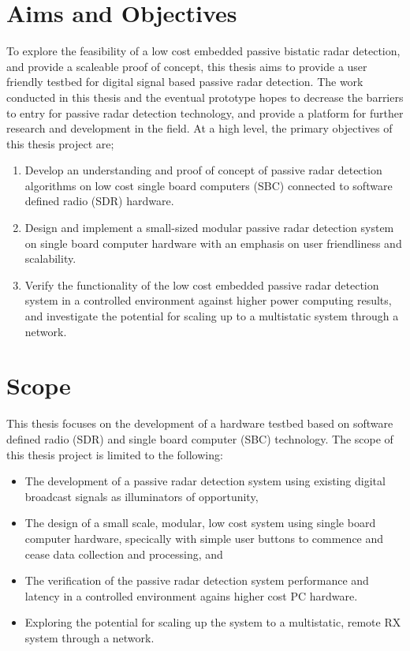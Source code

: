 \section{Aims and Objectives} \label{sec:aims}
To explore the feasibility of a low cost embedded passive bistatic radar detection, and provide a scaleable proof of concept, this thesis aims to provide a user friendly testbed for digital signal based passive radar detection. The work conducted in this thesis and the eventual prototype hopes to decrease the barriers to entry for passive radar detection technology, and provide a platform for further research and development in the field. At a high level, the primary objectives of this thesis project are;
\begin{enumerate}
    \item Develop an understanding and proof of concept of passive radar detection algorithms on low cost single board computers (SBC) connected to software defined radio (SDR) hardware.
    \item Design and implement a small-sized modular passive radar detection system on single board computer hardware with an emphasis on user friendliness and scalability.
    \item Verify the functionality of the low cost embedded passive radar detection system in a controlled environment against higher power computing results, and investigate the potential for scaling up to a multistatic system through a network. 
\end{enumerate}

\section{Scope}
This thesis focuses on the development of a hardware testbed based on software defined radio (SDR) and single board computer (SBC) technology. The scope of this thesis project is limited to the following:

\begin{itemize}
    \item The development of a passive radar detection system using existing digital broadcast signals as illuminators of opportunity,
    \item The design of a small scale, modular, low cost system using single board computer hardware, specically with simple user buttons to commence and cease data collection and processing, and 
    \item The verification of the passive radar detection system performance and latency in a controlled environment agains higher cost PC hardware.
    \item Exploring the potential for scaling up the system to a multistatic, remote RX system through a network.
\end{itemize}

